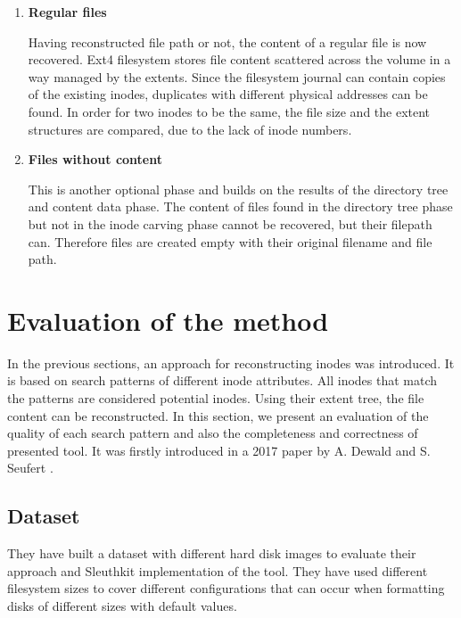 \documentclass{acm_proc_article-sp}
\begin{document}
\begin{enumerate}
\item \textbf{Regular files}

Having reconstructed file path or not, the content of a regular file is now recovered. Ext4 filesystem stores file content scattered across the volume in a way managed by the extents. Since the filesystem journal can contain copies of the existing inodes, duplicates with different physical addresses can be found. In order for two inodes to be the same, the file size and the extent structures are compared, due to the lack of inode numbers.

\item \textbf{Files without content}

This is another optional phase and builds on the results of the directory tree and content data phase. The content of files found in the directory tree phase but not in the inode carving phase cannot be recovered, but their filepath can. Therefore files are created empty with their original filename and file path.
\end{enumerate}

\section{Evaluation of the method}

In the previous sections, an approach for reconstructing inodes was introduced. It is based on search patterns of different inode attributes. All inodes that match the patterns are considered potential inodes. Using their extent tree, the file content can be reconstructed. In this section, we present an evaluation of the quality of each search pattern and also the completeness and correctness of presented tool. It was firstly introduced in a 2017 paper by A. Dewald and S. Seufert \cite{afeic}.

\subsection{Dataset}

They have built a dataset with different hard disk images to evaluate their approach and Sleuthkit implementation of the tool. They have used different filesystem sizes to cover different configurations that can occur when formatting disks of different sizes with default values. 
\end{document}
